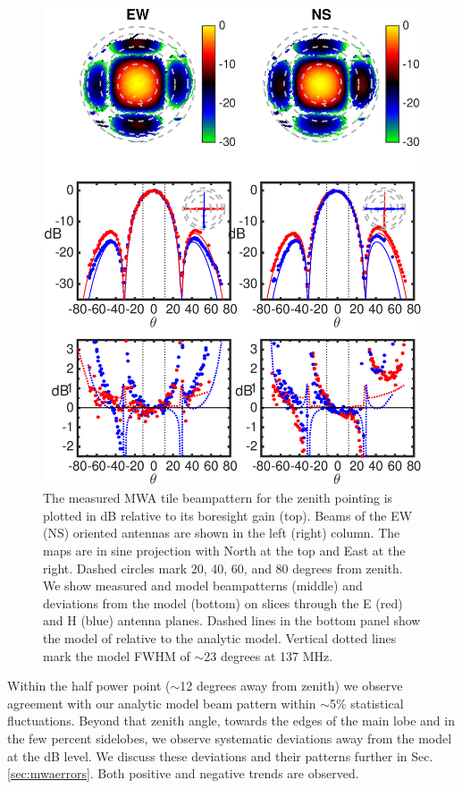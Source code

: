 \begin{figure}
\includegraphics[width=5in]{chap1_precision_beammapping_figures/Zenith_abs.eps}
\caption[Measured MWA tile beampattern for the zenith pointing.]{The measured MWA tile beampattern for the zenith pointing is plotted in dB relative to its boresight gain (top). Beams of the EW (NS) oriented antennas are shown in the left (right) column. The maps are in sine projection with North at the top and East at the right. Dashed circles mark 20, 40, 60, and 80 degrees from zenith. We show measured and model beampatterns (middle) and deviations from the model (bottom) on slices through the E (red) and H (blue) antenna planes. Dashed lines in the bottom panel show the model of \citet{sutinjo2015} relative to the analytic model. Vertical dotted lines mark the model FWHM of $\sim$23 degrees at 137 MHz.}
\label{fig:zenithtilemap}
\end{figure}

Within the half power point ($\sim$12 degrees away from zenith) we observe agreement with our analytic model beam pattern within $\sim$5\% statistical fluctuations. Beyond that zenith angle, towards the edges of the main lobe and in the few percent sidelobes, we observe systematic deviations away from the model at the dB level. We discuss these deviations and their patterns further in Sec. \ref{sec:mwaerrors}. Both positive and negative trends are observed.

